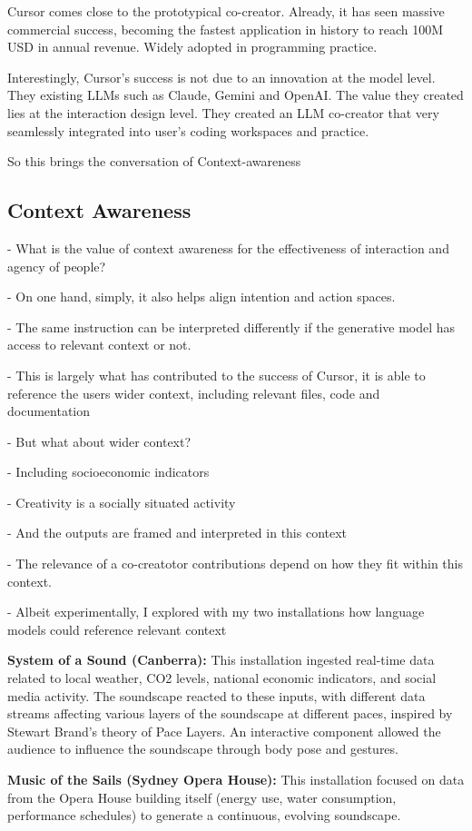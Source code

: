 Cursor comes close to the prototypical co-creator. 
Already, it has seen massive commercial success, becoming the fastest application in history to reach 100M USD in annual revenue. 
Widely adopted in programming practice. 

Interestingly, Cursor's success is not due to an innovation at the model level. They existing LLMs such as Claude, Gemini and OpenAI. 
The value they created lies at the interaction design level. 
They created an LLM co-creator that very seamlessly integrated into user's coding workspaces and practice. 

So this brings the conversation of Context-awareness

\subsection{Context Awareness}


- What is the value of context awareness for the effectiveness of interaction and agency of people?

- On one hand, simply, it also helps align intention and action spaces.

- The same instruction can be interpreted differently if the generative model has access to relevant context or not. 

- This is largely what has contributed to the success of Cursor, it is able to reference the users wider context, including relevant files, code and documentation

- But what about wider context? 

- Including socioeconomic indicators 

- Creativity is a socially situated activity

- And the outputs are framed and interpreted in this context

- The relevance of a co-creatotor contributions depend on how they fit within this context. 

- Albeit experimentally, I explored with my two installations how language models could reference relevant context

    \item \textbf{System of a Sound (Canberra):} This installation ingested real-time data related to local weather, CO2 levels, national economic indicators, and social media activity. The soundscape reacted to these inputs, with different data streams affecting various layers of the soundscape at different paces, inspired by Stewart Brand's theory of Pace Layers. An interactive component allowed the audience to influence the soundscape through body pose and gestures.
    \item \textbf{Music of the Sails (Sydney Opera House):} This installation focused on data from the Opera House building itself (energy use, water consumption, performance schedules) to generate a continuous, evolving soundscape.

